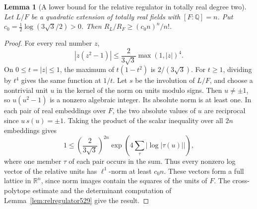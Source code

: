 \documentclass[a4paper,11pt]{article}
\newtheorem{lemma}[proposition]{Lemma}
\theoremstyle{definition}
\theoremstyle{remark}
\numberwithin{equation}{section}
\begin{document}
\begin{lemma}[A lower bound for the relative regulator in totally real degree two]
\leavevmode\label{lem:realunits634}
Let \(L/F\) be a quadratic extension of totally real fields with
\([F:\mathbb Q]=n\). Put \(c_0=\tfrac12\log(3\sqrt3/2)>0\).
Then \(R_L/R_F\ge(c_0 n)^n/n!\).
\end{lemma}
\begin{proof}
For every real number \(z\),
\[
       |z(z^2-1)|\le\frac{2}{3\sqrt3}\max(1,|z|)^4 .
\]
On \(0\le t=|z|\le1\), the maximum of \(t(1-t^2)\) is
\(2/(3\sqrt3)\). For \(t\ge1\), dividing by \(t^4\) gives the
same function at \(1/t\).
Let \(s\) be the involution of \(L/F\), and choose a nontrivial
unit \(u\) in the kernel of the norm on units modulo signs.
Then \(u\ne\pm1\), so \(u(u^2-1)\) is a nonzero algebraic integer.
Its absolute norm is at least one. In each pair of real embeddings
over \(F\), the two absolute values of \(u\) are reciprocal since
\(u\,s(u)=\pm1\). Taking the product of the scalar inequality over
all \(2n\) embeddings gives
\[
          1\le \left(\frac{2}{3\sqrt3}\right)^{2n}
                 \exp\left(4\sum_\tau|\log|\tau(u)||\right),
\]
where one member \(\tau\) of each pair occurs in the sum.
Thus every nonzero log vector of the relative units has
\(\ell^1\)-norm at least \(c_0 n\). These vectors form a full lattice
in \(\mathbb R^n\), since norm images contain the squares of the
units of \(F\). The cross-polytope estimate and the determinant
computation of Lemma~\ref{lem:relregulator529} give the result.
\end{proof}
\end{document}
